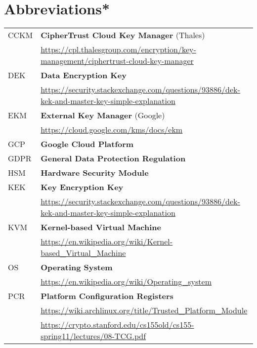 
\section{Abbreviations*}

\begin{tabular}{ ll }

CCKM
&  
\textbf{CipherTrust Cloud Key Manager }(Thales)\\
 & 
{\footnotesize\url{https://cpl.thalesgroup.com/encryption/key-management/ciphertrust-cloud-key-manager}} 
\\

DEK
&
\textbf{Data Encryption Key}\\
 & 
{\footnotesize\url{https://security.stackexchange.com/questions/93886/dek-kek-and-master-key-simple-explanation} }
\\

EKM
&
\textbf{External Key Manager} (Google)\\
 & 
{\footnotesize\url{https://cloud.google.com/kms/docs/ekm} }
\\

GCP
&
\textbf{Google Cloud Platform}
\\

GDPR
&
\textbf{General Data Protection Regulation}
\\

HSM
&
\textbf{Hardware Security Module} 
\\

KEK
&
\textbf{Key Encryption Key}\\
 & 
{\footnotesize\url{https://security.stackexchange.com/questions/93886/dek-kek-and-master-key-simple-explanation} }
\\ 

KVM
&
\textbf{Kernel-based Virtual Machine}\\
 & 
{\footnotesize\url{https://en.wikipedia.org/wiki/Kernel-based_Virtual_Machine} }
\\

OS
&
\textbf{Operating System}\\
 & 
{\footnotesize\url{https://en.wikipedia.org/wiki/Operating_system} }
\\

PCR
&
\textbf{Platform Configuration Registers }\\
 & 
{\footnotesize\url{https://wiki.archlinux.org/title/Trusted_Platform_Module}}\\
 & 
{\footnotesize\url{https://crypto.stanford.edu/cs155old/cs155-spring11/lectures/08-TCG.pdf} }
\\


\end{tabular}
